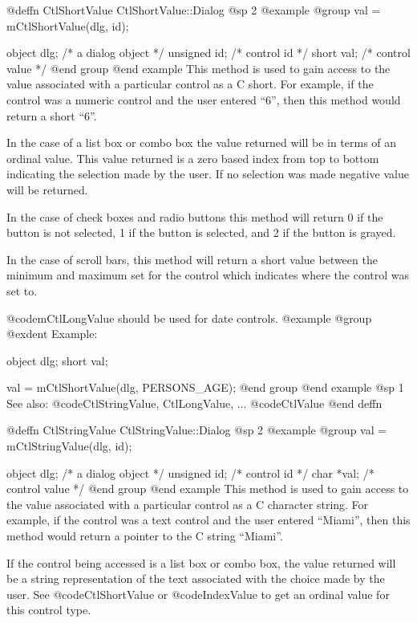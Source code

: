 @deffn {CtlShortValue} CtlShortValue::Dialog
@sp 2
@example
@group
val = mCtlShortValue(dlg, id);

object  dlg;    /*  a dialog object  */
unsigned id;    /*  control id       */
short   val;    /*  control value    */
@end group
@end example
This method is used to gain access to the value associated with a
particular control as a C short.  For example, if the control
was a numeric control and the user entered ``6'', then this method
would return a short ``6''.

In the case of a list box or combo box the value returned will be in
terms of an ordinal value. This value returned is a zero based index
from top to bottom indicating the selection made by the user.  If no
selection was made negative value will be returned.  

In the case of check boxes and radio buttons this method will return
0 if the button is not selected, 1 if the button is selected, and
2 if the button is grayed.

In the case of scroll bars, this method will return a short value
between the minimum and maximum set for the control which indicates
where the control was set to.

@code{mCtlLongValue} should be used for date controls.
@example
@group
@exdent Example:

object  dlg;
short   val;

val = mCtlShortValue(dlg, PERSONS_AGE);
@end group
@end example
@sp 1
See also:  @code{CtlStringValue, CtlLongValue, ...}
        @code{CtlValue}
@end deffn















@deffn {CtlStringValue} CtlStringValue::Dialog
@sp 2
@example
@group
val = mCtlStringValue(dlg, id);

object  dlg;    /*  a dialog object  */
unsigned id;    /*  control id       */
char    *val;   /*  control value    */
@end group
@end example
This method is used to gain access to the value associated with a
particular control as a C character string.  For example, if the control
was a text control and the user entered ``Miami'', then this method
would return a pointer to the C string ``Miami''.

If the control being accessed is a list box or combo box, the value
returned will be a string representation of the text associated with the
choice made by the user.  See @code{CtlShortValue} or @code{IndexValue}
to get an ordinal value for this control type.

